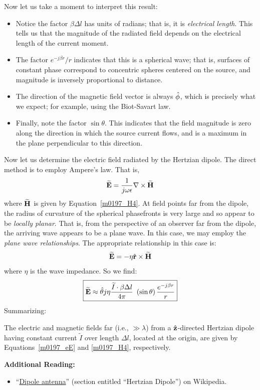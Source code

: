Now let us take a moment to interpret this result:
\begin{itemize}
\item Notice the factor $\beta \Delta l$ has units of radians; that is, it is \emph{electrical length}.
This tells us that the magnitude of the radiated field depends on the electrical length of the current moment.
\item The factor $e^{-j\beta r}/r$ indicates that this is a spherical wave; that is, surfaces of constant phase correspond to concentric spheres centered on the source, and magnitude is inversely proportional to distance.
\item The direction of the magnetic field vector is always $\hat{\bf \phi}$, which is precisely what we expect; for example, using the Biot-Savart law.
\item Finally, note the factor $\sin\theta$.  This indicates that the field magnitude is zero along the direction in which the source current flows, and is a maximum in the plane perpendicular to this direction.
\end{itemize}

Now let us determine the electric field radiated by the Hertzian dipole.
The direct method is to employ Ampere's law.
That is,
%
\begin{equation}
\widetilde{\bf E} = \frac{1}{j\omega\epsilon} \nabla \times \widetilde{\bf H}
\end{equation}
%
where $\widetilde{\bf H}$ is given by Equation~\ref{m0197_H4}.
At field points far from the dipole, the radius of curvature of the spherical phasefronts is very large and so appear to be \emph{locally planar}. 
That is, from the perspective of an observer far from the dipole, the arriving wave appears to be a plane wave. 
In this case, we may employ the \emph{plane wave relationships}.
The appropriate relationship in this case is:
%
\begin{equation}
\widetilde{\bf E} = -\eta \hat{\bf r} \times \widetilde{\bf H}
\end{equation}
%
where $\eta$ is the wave impedance.
So we find:
%
\begin{equation}
\boxed{
\widetilde{\bf E} \approx \hat{\bf \theta} j\eta \frac{\widetilde{I}\cdot\beta \Delta l}{4\pi}~\left(\sin\theta\right) \frac{e^{-j\beta r}}{r} 
}
\label{m0197_eE}
\end{equation}
%
Summarizing:
\begin{mdframed}[backgroundcolor=yellow!20,nobreak=true] 
The electric and magnetic fields far (i.e., $\gg\lambda$) from a $\hat{\bf z}$-directed Hertzian dipole having constant current $\widetilde{I}$ over length $\Delta l$, located at the origin, are given by Equations~\ref{m0197_eE} and \ref{m0197_H4}, respectively. 
\end{mdframed}


{\bf Additional Reading:}
\begin{itemize}
\item ``\href{https://en.wikipedia.org/wiki/Dipole_antenna#Hertzian_dipole}{Dipole antenna}'' (section entitled ``Hertzian Dipole'') on Wikipedia.
\end{itemize}



